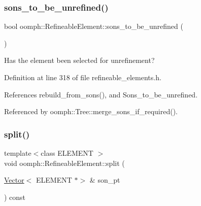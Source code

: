 \mbox{\label{classoomph_1_1RefineableElement_adbe65126a89ecd94236e5b9fc24f0f15}} 
\subsubsection{\texorpdfstring{sons\+\_\+to\+\_\+be\+\_\+unrefined()}{sons\_to\_be\_unrefined()}}
{\footnotesize\ttfamily bool oomph\+::\+Refineable\+Element\+::sons\+\_\+to\+\_\+be\+\_\+unrefined (\begin{DoxyParamCaption}{ }\end{DoxyParamCaption})\hspace{0.3cm}{\ttfamily [inline]}}



Has the element been selected for unrefinement? 



Definition at line 318 of file refineable\+\_\+elements.\+h.



References rebuild\+\_\+from\+\_\+sons(), and Sons\+\_\+to\+\_\+be\+\_\+unrefined.



Referenced by oomph\+::\+Tree\+::merge\+\_\+sons\+\_\+if\+\_\+required().

\mbox{\label{classoomph_1_1RefineableElement_ad63bc42c2105ffbd5885ada20b4e88eb}} 
\subsubsection{\texorpdfstring{split()}{split()}}
{\footnotesize\ttfamily template$<$class E\+L\+E\+M\+E\+NT $>$ \\
void oomph\+::\+Refineable\+Element\+::split (\begin{DoxyParamCaption}\item[{\hyperlink{classoomph_1_1Vector}{Vector}$<$ E\+L\+E\+M\+E\+NT $\ast$$>$ \&}]{son\+\_\+pt }\end{DoxyParamCaption}) const\hspace{0.3cm}{\ttfamily [inline]}}



